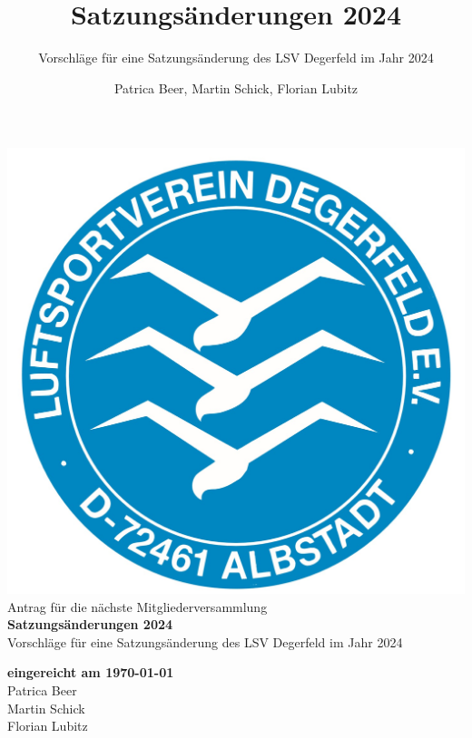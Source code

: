 \documentclass[10pt,a4paper,parskip=half]{scrartcl}
\title{Satzungsänderungen 2024}
\subtitle{Vorschläge für eine Satzungsänderung des LSV Degerfeld im Jahr 2024}
\author{Patrica Beer, Martin Schick, Florian Lubitz}
\begin{document}
\begin{titlepage}

  \begin{center}
  \includegraphics[scale=0.2]{../logo}\\[15ex]
  
  
  \large{Antrag für die nächste Mitgliederversammlung}\\[2ex]
  
  \LARGE{\textbf{Satzungsänderungen 2024}}\\[2ex]
  \large{Vorschläge für eine Satzungsänderung des LSV Degerfeld im Jahr 2024}\\[30ex]
  
  \normalsize
  
  \textbf{eingereicht am {\today}}\\[1.5ex]
  Patrica Beer\\ Martin Schick\\ Florian Lubitz
  \\[3ex]
  
  \end{center}
  
  \end{titlepage}
\end{document}
